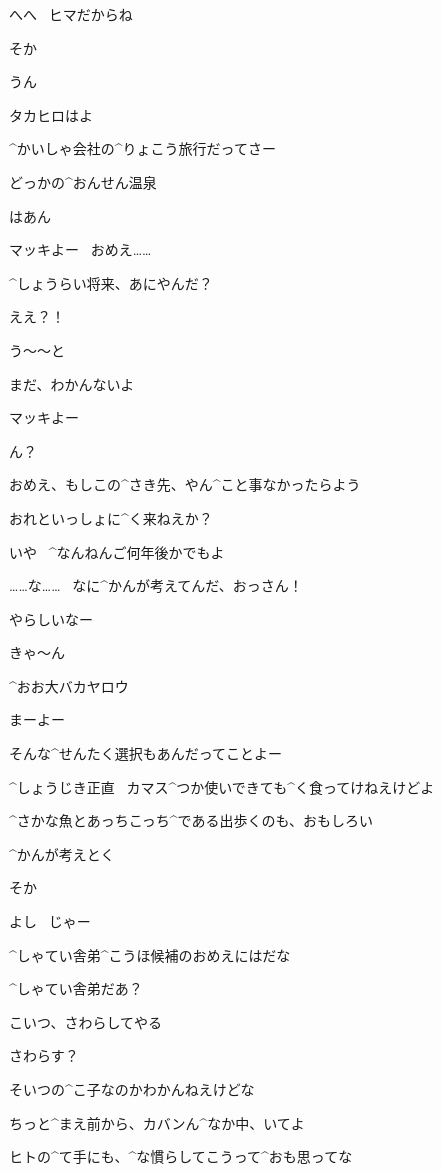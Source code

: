 \Makki へへ
\ ヒマだからね

\Ayase そか

\Makki うん

\Ayase タカヒロはよ

\Makki ^{かいしゃ}{会社}の^{りょこう}{旅行}だってさー

\Makki どっかの^{おんせん}{温泉}

\Ayase はあん

\page[142]
\Ayase マッキよー
\ おめえ……

\Ayase ^{しょうらい}{将来}、あにやんだ？

\Makki ええ？！

\Makki う〜〜と

\Makki まだ、わかんないよ

\page[143]
\Ayase マッキよー

\Makki ん？

\Ayase おめえ、もしこの^{さき}{先}、やん^{こと}{事}なかったらよう

\Ayase おれといっしょに^{く}{来}ねえか？

\Ayase いや
\ ^{なんねんご}{何年後}かでもよ

\page[144]
\Makki ……な……
\ なに^{かんが}{考}えてんだ、おっさん！

\Makki やらしいなー

\Makki きゃ〜ん

\Ayase ^{おお}{大}バカヤロウ

\Ayase まーよー

\Ayase そんな^{せんたく}{選択}もあんだってことよー

\Ayase ^{しょうじき}{正直}
\ カマス^{つか}{使}いできても^{く}{食}ってけねえけどよ

\Ayase ^{さかな}{魚}とあっちこっち^{である}{出歩}くのも、おもしろい

\page[145]
\Makki ^{かんが}{考}えとく

\Ayase そか

\Ayase よし
\ じゃー

\Ayase ^{しゃてい}{舎弟}^{こうほ}{候補}のおめえにはだな

\Makki ^{しゃてい}{舎弟}だあ？

\Ayase こいつ、さわらしてやる

\Makki さわらす？

\page[147]
\Ayase そいつの^{こ}{子}なのかわかんねえけどな

\Ayase ちっと^{まえ}{前}から、カバンん^{なか}{中}、いてよ

\Ayase ヒトの^{て}{手}にも、^{な}{慣}らしてこうって^{おも}{思}ってな

